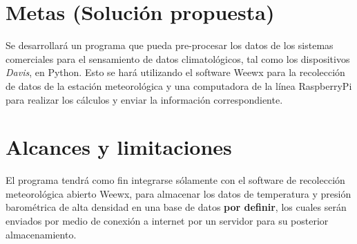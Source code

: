 \section{Metas (Solución propuesta)}

Se desarrollará un programa que pueda pre-procesar los datos de los sistemas comerciales para el sensamiento de datos climatológicos, tal como los dispositivos \textit{Davis}, en Python. Esto se hará utilizando el software Weewx para la recolección de datos de la estación meteorológica y una computadora de la línea RaspberryPi para realizar los cálculos y enviar la información correspondiente.

\section{Alcances y limitaciones}

El programa tendrá como fin integrarse sólamente con el software de recolección meteorológica abierto Weewx, para almacenar los datos de temperatura y presión barométrica de alta densidad en una base de datos \textbf{por definir}, los cuales serán enviados por medio de conexión a internet por un servidor para su posterior almacenamiento.

